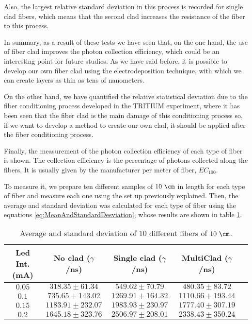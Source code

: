 Also, the largest relative standard deviation in this process is recorded for single clad fibers, which means that the second clad increases the resistance of the fiber to this process.

In summary, as a result of these tests we have seen that, on the one hand, the use of fiber clad improves the photon collection efficiency, which could be an interesting point for future studies. As we have said before, it is possible to develop our own fiber clad using the electrodeposition technique, with which we can create layers as thin as tens of nanometers.

On the other hand, we have quantified the relative statistical deviation due to the fiber conditioning process developed in the TRITIUM experiment, where it has been seen that the fiber clad is the main damage of this conditioning process so, if we want to develop a method to create our own clad, it should be applied after the fiber conditioning process.

Finally, the measurement of the photon collection efficiency of each type of fiber is shown. The collection efficiency is the percentage of photons collected along the fibers. It is usually given by the manufacturer per meter of fiber, $ EC_ {100} $.

To measure it, we prepare ten different samples of $10~\cm$ in length for each type of fiber and measure each one using the set up previously explained. Then, the average and standard deviation was calculated for each type of fiber using the equations \ref{eq:MeanAndStandardDesviation}, whose results are shown in table \ref{tab:10DifferentSamplesAlltypes}.

\begin{table}[htbp]
\begin{center}
\begin{tabular}{|c|c|c|c|c|}
\hline
Led Int. (mA) & No clad ($\gamma$/ns) & Single clad ($\gamma$/ns) & MultiClad ($\gamma$/ns) \\
\hline \hline \hline
$0.05$ & $318.35 \pm 61.34$ & $549.62 \pm 70.79$ & $480.35 \pm 83.72$ \\ \hline
$0.1$ & $735.65 \pm 143.02$ & $1269.91 \pm 164.32$ & $1110.66 \pm 193.44$ \\ \hline
$0.15$ & $1183.91 \pm 232.07$ & $1983.93 \pm 230.97$ & $1777.40\pm 307.19$ \\ \hline
$0.2$ & $1645.18 \pm 323.76$ & $2506.97 \pm 208.01$ & $2338.43 \pm 350.24$ \\ \hline
\end{tabular}
\caption{Average and standard deviation of 10 different fibers of $10~\cm$.}
\label{tab:10DifferentSamplesAlltypes}
\end{center}
\end{table}

